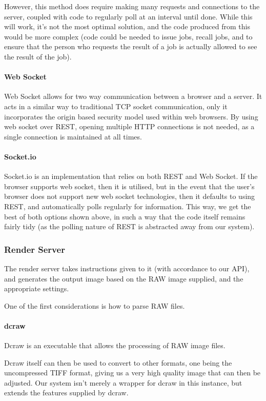 \documentclass[12pt,a4paper]{article}
\begin{document}
However, this method does require making many requests and connections to the server,
coupled with code to regularly poll at an interval until done. While this will work, it's not the most
optimal solution, and the code produced from this would be more complex (code could be needed to issue jobs, recall jobs,
and to ensure that the person who requests the result of a job is actually allowed to see the result of the job).

\paragraph{Web Socket}
Web Socket allows for two way communication between a browser and a server. It acts in a similar
way to traditional TCP socket communication, only it incorporates the origin based security
model used within web browsers. By using web socket over REST, opening multiple HTTP connections
is not needed, as a single connection is maintained at all times. \cite{WebSocketProtocol}

\paragraph{Socket.io}
Socket.io is an implementation that relies on both REST and Web Socket.
If the browser supports web socket, then it is utilised, but in the event that the
user's browser does not support new web socket technologies, then it defaults to
using REST, and automatically polls regularly for information. This way, we get the
best of both options shown above, in such a way that the code itself remains fairly
tidy (as the polling nature of REST is abstracted away from our system).

\subsubsection{Render Server}
The render server takes instructions given to it (with accordance to our API), and
generates the output image based on the RAW image supplied, and the appropriate settings.

One of the first considerations is how to parse RAW files.

\paragraph{dcraw}
Dcraw is an executable that allows the processing of RAW image files.

Dcraw itself can then be used to convert to other formats, one being the uncompressed TIFF format,
giving us a very high quality image that can then be adjusted. Our system isn't merely a wrapper for
dcraw in this instance, but extends the features supplied by dcraw.
\end{document}
